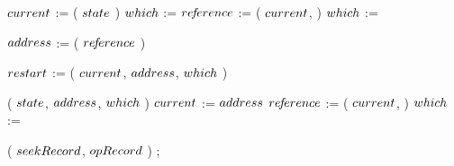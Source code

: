 \begin{limitscope}
{\begin{algorithm}[tb]
{{			\BlankLine
			
			$current$ := \GetTop( $state$ )\;
			{
			   \label{lin:local-seek|successor:while:traversal:if:begin}
			   $which$ := \RIGHT\;
				 \label{lin:local-seek|successor:while:traversal:if:end}
			}
			\Else
			{
			   \label{lin:local-seek|successor:while:traversal:else:begin}
		 	   $re\!f\!erence$ := \GetChild( $current$, \LEFT{} )\;
			   $which$ := \LEFT\;
				 \label{lin:local-seek|successor:while:traversal:else:end}
			}
			
			\Repeat{\True}
	    {
			   \label{lin:local-seek|successor:while:traversal:begin}
				
				 $address$ := \GetAddress( $re\!f\!erence$ )\;	
				
				 \BlankLine
				
				 $\restart$ := \Move( $current$, $address$, $which$ )\;
				 \label{lin:local-seek|successor:while:traversal:move}
			   \If{$\restart$}
			   {
				    \Break\;
						\label{lin:local-seek|successor:while:traversal:restart}
			   }  
				 
				 \AddToTop( $state$, $address$, $which$ )\;
				 \label{lin:local-seek|successor:while:traversal:stack}
				 \label{lin:local-seek|successor:while:traversal:advance:begin}
			   $current$ := $address$\;
			   $re\!f\!erence$ := \GetChild( $current$, \LEFT{} )\;
			   $which$ := \LEFT{}\;
				 \label{lin:local-seek|successor:while:traversal:advance:end}
				 \label{lin:local-seek|successor:while:traversal:end}
			}
			\label{lin:local-seek|successor:while:end}
	 }
	
	
	 \BlankLine
	
	 \PopulateSeekRecord( $seekRecord$, $opRecord$ )\;
	 \Return \True;
	 \label{lin:local-seek|successor:end}
}
\end{algorithm}

}


\end{limitscope}